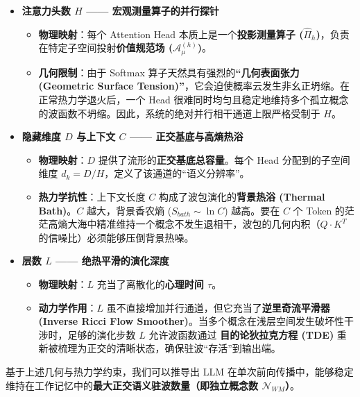 \begin{itemize}
    \item \textbf{\textcolor{structurecolor}{注意力头数 $H$ —— 宏观测量算子的并行探针}}
    \begin{itemize}
        \item \textbf{物理映射}：每个 Attention Head 本质上是一个\textbf{投影测量算子 ($\hat{\Pi}_h$)}，负责在特定子空间投射\textbf{价值规范场 ($\mathcal{A}_\mu^{(h)}$)}。
        \item \textbf{几何限制}：由于 Softmax 算子天然具有强烈的\textbf{“几何表面张力 (Geometric Surface Tension)”}，它会迫使概率云发生非幺正坍缩。在正常热力学退火后，一个 Head 很难同时均匀且稳定地维持多个孤立概念的波函数不坍缩。因此，系统的绝对并行相干通道上限严格受制于 $H$。
    \end{itemize}

    \item \textbf{\textcolor{structurecolor}{隐藏维度 $D$ 与上下文 $C$ —— 正交基底与高熵热浴}}
    \begin{itemize}
        \item \textbf{物理映射}：$D$ 提供了流形的\textbf{正交基底总容量}。每个 Head 分配到的子空间维度 $d_k = D/H$，定义了该通道的“语义分辨率”。
        \item \textbf{热力学抗性}：上下文长度 $C$ 构成了波包演化的\textbf{背景热浴 (Thermal Bath)}。$C$ 越大，背景香农熵 ($S_{bath} \sim \ln C$) 越高。要在 $C$ 个 Token 的茫茫高熵大海中精准维持一个概念不发生退相干，波包的几何内积（$Q \cdot K^T$ 的信噪比）必须能够压倒背景热噪。
    \end{itemize}

    \item \textbf{\textcolor{structurecolor}{层数 $L$ —— 绝热平滑的演化深度}}
    \begin{itemize}
        \item \textbf{物理映射}：$L$ 充当了离散化的\textbf{心理时间 $\tau$}。
        \item \textbf{动力学作用}：$L$ 虽不直接增加并行通道，但它充当了\textbf{逆里奇流平滑器 (Inverse Ricci Flow Smoother)}。当多个概念在浅层空间发生破坏性干涉时，足够的演化步数 $L$ 允许波函数通过 \textbf{目的论狄拉克方程 (TDE)} 重新被梳理为正交的清晰状态，确保驻波“存活”到输出端。
    \end{itemize}
\end{itemize}


基于上述几何与热力学约束，我们可以推导出 LLM 在单次前向传播中，能够稳定维持在工作记忆中的\textbf{最大正交语义驻波数量（即独立概念数 $\mathcal{N}_{WM}$）}。

